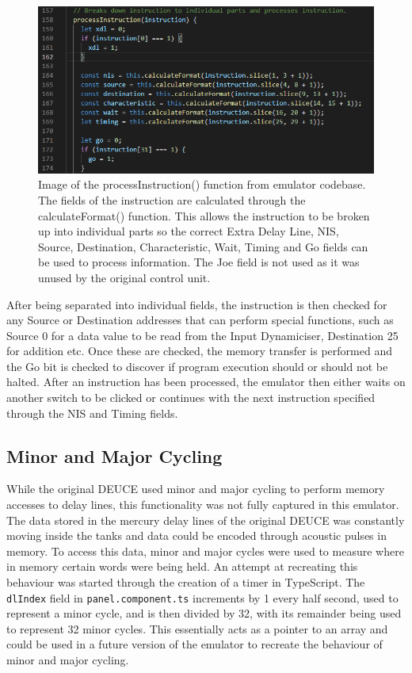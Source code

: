 \documentclass{l4proj}
\begin{document}
\begin{figure}[h]
	\centering
	\includegraphics[width=\linewidth]{images/instruction-fields}
	\caption{Image of the processInstruction() function from emulator codebase. The fields of the instruction are calculated through the calculateFormat() function. This allows the instruction to be broken up into individual parts so the correct Extra Delay Line, NIS, Source, Destination, Characteristic, Wait, Timing and Go fields can be used to process information. The Joe field is not used as it was unused by the original control unit.}
	\label{fig:process-instruction}
\end{figure}

After being separated into individual fields, the instruction is then checked for any Source or Destination addresses that can perform special functions, such as Source 0 for a data value to be read from the Input Dynamiciser, Destination 25 for addition etc. Once these are checked, the memory transfer is performed and the Go bit is checked to discover if program execution should or should not be halted. After an instruction has been processed, the emulator then either waits on another switch to be clicked or continues with the next instruction specified through the NIS and Timing fields.

\subsection{Minor and Major Cycling}
While the original DEUCE used minor and major cycling to perform memory accesses to delay lines, this functionality was not fully captured in this emulator. The data stored in the mercury delay lines of the original DEUCE was constantly moving inside the tanks and data could be encoded through acoustic pulses in memory. To access this data, minor and major cycles were used to measure where in memory certain words were being held. An attempt at recreating this behaviour was started through the creation of a timer in TypeScript. The \texttt{dlIndex} field in \texttt{panel.component.ts} increments by 1 every half second, used to represent a minor cycle, and is then divided by 32, with its remainder being used to represent 32 minor cycles. This essentially acts as a pointer to an array and could be used in a future version of the emulator to recreate the behaviour of minor and major cycling.
\end{document}
